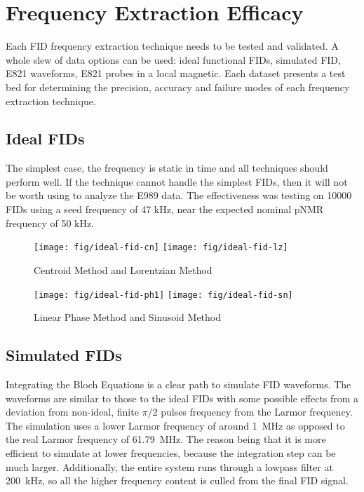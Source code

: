 
\section{Frequency Extraction Efficacy}

Each FID frequency extraction technique needs to be tested and validated.  A whole slew of data options can be used: ideal functional FIDs, simulated FID, E821 waveforms, E821 probes in a local \uw magnetic.  Each dataset presents a test bed for determining the precision, accuracy and failure modes of each frequency extraction technique.

\subsection{Ideal FIDs}
The simplest case, the frequency is static in time and all techniques should perform well.  If the technique cannot handle the simplest FIDs, then it will not be worth using to analyze the E989 data.  The effectiveness was testing on 10000 FIDs using a seed frequency of 47 kHz, near the expected nominal pNMR frequency of 50 kHz.  

\begin{figure}
    \label{fig:ideal-fid-spectral}
    \texttt{[image: fig/ideal-fid-cn]}
    \texttt{[image: fig/ideal-fid-lz]}
    \caption{Centroid Method and Lorentzian Method}
\end{figure}

\begin{figure}
    \label{fig:ideal-fid-time-domain}
    \texttt{[image: fig/ideal-fid-ph1]}
    \texttt{[image: fig/ideal-fid-sn]}
    \caption{Linear Phase Method and Sinusoid Method}
\end{figure}


\subsection{Simulated FIDs}
Integrating the Bloch Equations is a clear path to simulate FID waveforms.  The waveforms are similar to those to the ideal FIDs with some possible effects from a deviation from non-ideal, finite $\pi/2$ pulses frequency from the Larmor frequency.  The simulation uses a lower Larmor frequency of around \SI{1}{\MHz} as opposed to the real Larmor frequency of \SI{61.79}{\MHz}.  The reason being that it is more efficient to simulate at lower frequencies, because the integration step can be much larger.  Additionally, the entire system runs through a lowpass filter at \SI{200}{\kHz}, so all the higher frequency content is culled from the final FID signal.

